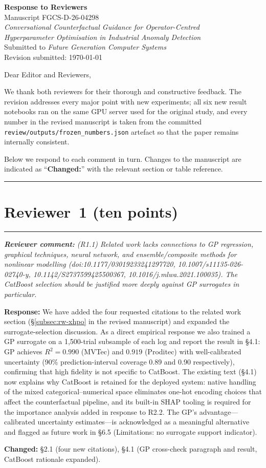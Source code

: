\documentclass[11pt,a4paper]{article}
\newcommand{\revquote}[1]{\smallskip\noindent\textit{\textbf{Reviewer comment:} #1}\smallskip}
\newcommand{\response}[1]{\noindent\textbf{Response:} #1\par}
\begin{document}
\begin{center}
  {\Large\bfseries Response to Reviewers}\\[6pt]
  Manuscript FGCS-D-26-04298\\
  \textit{Conversational Counterfactual Guidance for Operator-Centred\\
  Hyperparameter Optimisation in Industrial Anomaly Detection}\\[4pt]
  Submitted to \textit{Future Generation Computer Systems}\\[4pt]
  Revision submitted: \today
\end{center}

\bigskip
\noindent Dear Editor and Reviewers,

We thank both reviewers for their thorough and constructive feedback.
The revision addresses every major point with new experiments; all
six new result notebooks ran on the same GPU server used for the
original study, and every number in the revised manuscript is taken
from the committed \texttt{review/outputs/frozen\_numbers.json}
artefact so that the paper remains internally consistent.

Below we respond to each comment in turn.
Changes to the manuscript are indicated as ``\textbf{Changed:}''
with the relevant section or table reference.

\bigskip
\hrule
\section*{Reviewer~1 (ten points)}
\hrule
\bigskip

\revquote{(R1.1) Related work lacks connections to GP regression, graphical
techniques, neural network, and ensemble/composite methods for
nonlinear modelling (doi:10.1177/03019233241297720,
10.1007/s11135-026-02740-y, 10.1142/S2737599425500367,
10.1016/j.mlwa.2021.100035). The CatBoost selection should be
justified more deeply against GP surrogates in particular.}

\response{We have added the four requested citations to the related
work section (\S\ref{subsec:rw-xhpo} in the revised manuscript) and
expanded the surrogate-selection discussion.
As a direct empirical response we also trained a GP surrogate
on a 1,500-trial subsample of each log and report the result in
\S4.1: GP achieves $R^2 = 0.990$ (MVTec) and $0.919$ (Proditec) with
well-calibrated uncertainty (90\% prediction-interval coverage 0.89
and 0.90 respectively), confirming that high fidelity is not specific
to CatBoost. The existing text (\S4.1) now explains why CatBoost is
retained for the deployed system: native handling of the
mixed categorical--numerical space eliminates one-hot encoding
choices that affect the counterfactual pipeline, and its built-in SHAP
tooling is required for the importance analysis added in response to
R2.2. The GP's advantage---calibrated uncertainty estimates---is
acknowledged as a meaningful alternative and flagged as future work in
\S6.5 (Limitations: no surrogate support indicator).

\noindent\textbf{Changed:} \S2.1 (four new citations), \S4.1
(GP cross-check paragraph and result, CatBoost rationale expanded).}
\end{document}

